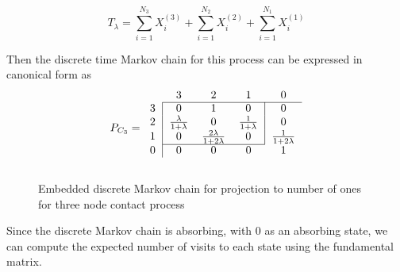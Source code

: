 \documentclass{article}
\theoremstyle{plain}
\theoremstyle{definition}
\theoremstyle{remark}
\numberwithin{equation}{section}
\begin{document}
\begin{equation}
    T_\lambda = \sum_{i = 1}^{N_3} X_i^{(3)} + \sum_{i = 1}^{N_2} X_i^{(2)} + \sum_{i = 1}^{N_1} X_i^{(1)}
\end{equation}

Then the discrete time Markov chain for this process can be expressed in canonical form as
$$
P_{C_3} = \begin{blockarray}{ccccc}
    & 3 & 2 & 1 & 0\\
    \begin{block}{c|ccc|c}
    \cline{2-5}
        3 & 0 & 1 & 0 & 0 \\
        2 & \frac{\lambda}{1 + \lambda} & 0 &
        \frac{1}{1 + \lambda} & 0\\
        1 & 0 & \frac{2\lambda}{1 + 2 \lambda} & 0 & \frac{1}{1 + 2\lambda}\\
    \cline{2-4}
    \end{block}
    \begin{block}{c|cccc}
    0 & 0 & 0 & 0 & 1\\
    \end{block}
\end{blockarray}
$$

\begin{figure}
    \centering
    \caption{Embedded discrete Markov chain for projection to number of ones for three node contact process}
    \label{fig:discrete_mc_three_contact}
\end{figure}

Since the discrete Markov chain is absorbing, with 0 as an absorbing state, we can compute the expected number of visits to each state using the fundamental matrix.

\end{document}
